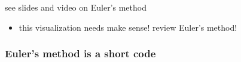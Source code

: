 \documentclass[urlcolor=blue,dvipsnames]{beamer}
\begin{document}
\begin{frame}{see slides and video on Euler's method}
\begin{itemize}
    \begin{itemize}
    \item this visualization needs make sense! review Euler's method!
    \end{itemize}
\end{itemize}
\end{frame}


\begin{frame}[fragile]
\frametitle{Euler's method is a short code}

\bigskip
{}
\end{frame}

\end{document}
